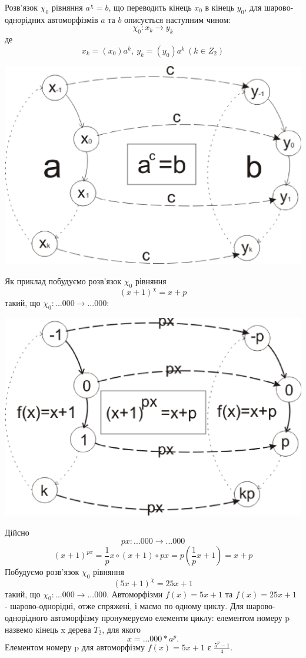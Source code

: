 \documentclass[a4paper,12pt]{article} \usepackage{a4wide}
\numberwithin{equation}{subsection}
\begin{document}
Розв'язок $\chi_0$ рівняння $a^\chi=b$, що переводить кінець $x_0$ в кінець $y_0$, для шарово-однорідних
автоморфізмів $a$ та $b$
  описується наступним чином:
$$\chi_0:x_k\rightarrow y_k$$ де $$x_k=(x_0)a^k,\  y_k=(y_0)a^k\  (k\in Z_2)$$
\begin{center}
\includegraphics[scale=0.5]{conjab.eps}
\end{center}
 Як приклад побудуємо розв'язок $\chi_0$ рівняння $$(x+1)^{\chi}=x+p$$ такий, що $\chi_0:...000\rightarrow ...000$:
 \begin{center}
\includegraphics[scale=0.5]{conj1p.eps}
\end{center}
Дійсно $$px:...000\rightarrow ...000$$
 $$(x+1)^{px}=\frac{1}{p}x\circ (x+1)\circ px=p(\frac{1}{p}x+1)=x+p$$
 Побудуємо розв'язок $\chi_0$ рівняння $$(5x+1)^{\chi}=25x+1$$ такий, що $\chi_0:...000\rightarrow ...000$.
  Автоморфізми $f(x)=5x+1$ та $f(x)=25x+1$ - шарово-однорідні, отже спряжені, і маємо по одному циклу.
 Для шарово-однорідного автоморфізму пронумеруємо елементи циклу: елементом номеру p назвемо кінець x дерева $T_2$, для якого $$x=...000*a^p.$$
  Елементом номеру p для автоморфізму $f(x)=5x+1$ є $\frac{5^p-1}{4}$.
\end{document}
